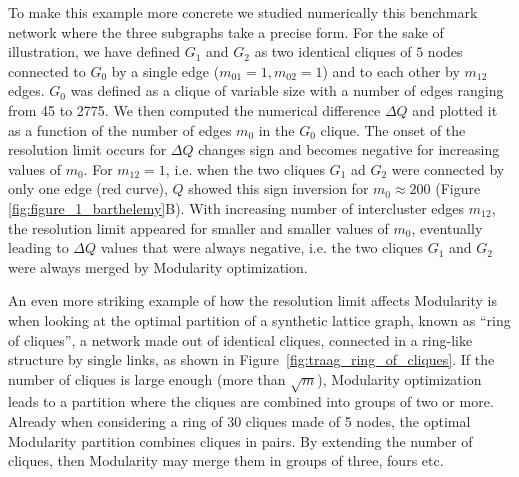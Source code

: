 To make this example more concrete we studied numerically this benchmark network where the three subgraphs take a precise form. For the sake of illustration, we have defined $G_1$ and $G_2$ as two identical cliques of $5$ nodes connected to $G_0$ by a single edge ($m_{01}=1, m_{02}=1$) and to each other by $m_{12}$ edges. $G_0$ was defined as a clique of variable size with a number of edges ranging from 45 to 2775. We then computed the numerical difference $\Delta Q$ and plotted it as a function of the number of edges $m_0$ in the $G_0$ clique. The onset of the resolution limit occurs for $\Delta Q$ changes sign and becomes negative for increasing values of $m_0$. For $m_{12}=1$, i.e. when the two cliques $G_1$ ad $G_2$ were connected by only one edge (red curve), $Q$ showed this sign inversion for $m_0 \approx 200$ (Figure \ref{fig:figure_1_barthelemy}B). With increasing number of intercluster edges $m_{12}$, the resolution limit appeared for smaller and smaller values of $m_0$, eventually leading to $\Delta Q$ values that were always negative, i.e. the two cliques $G_1$ and $G_2$ were always merged by Modularity optimization.



An even more striking example of how the resolution limit affects Modularity is when looking at the optimal partition of a synthetic lattice graph, known as ``ring of cliques'', a network made out of identical cliques, connected in a ring-like structure by single links, as shown in Figure~\ref{fig:traag_ring_of_cliques}. If the number of cliques is large enough (more than $\sqrt{m}$), Modularity optimization leads to a partition where the cliques are combined into groups of two or more. Already when considering a ring of 30 cliques made of 5 nodes, the optimal Modularity partition combines cliques in pairs. By extending the number of cliques, then Modularity may merge them in groups of three, fours etc.

